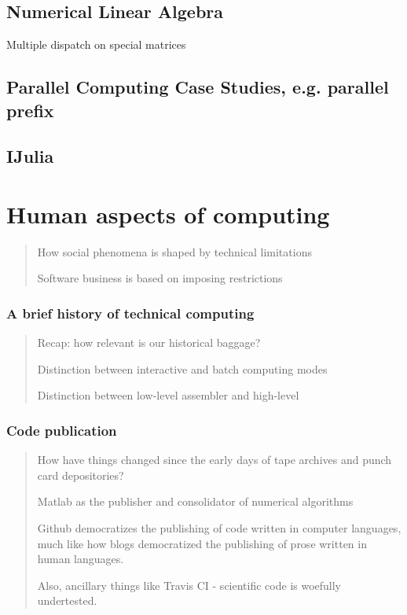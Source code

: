 \documentclass[12pt]{mitthesis}
\begin{document}
\chapter{Numerical Linear Algebra}

Multiple dispatch on special matrices


\chapter{Parallel Computing Case Studies, e.g. parallel prefix}


\chapter{IJulia}


\part{Human aspects of computing}
\begin{quotation}
How social phenomena is shaped by technical limitations

Software business is based on imposing restrictions
\end{quotation}

\section{A brief history of technical computing}
\begin{quotation}
Recap: how relevant is our historical baggage?

Distinction between interactive and batch computing modes

Distinction between low-level assembler and high-level
\end{quotation}

\section{Code publication}
\begin{quotation}
How have things changed since the early days of tape archives and
punch card depositories?

Matlab as the publisher and consolidator of numerical algorithms

Github democratizes the publishing of code written in computer languages,
much like how blogs democratized the publishing of prose written in
human languages.

Also, ancillary things like Travis CI - scientific code is woefully
undertested.
\end{quotation}
\end{document}

